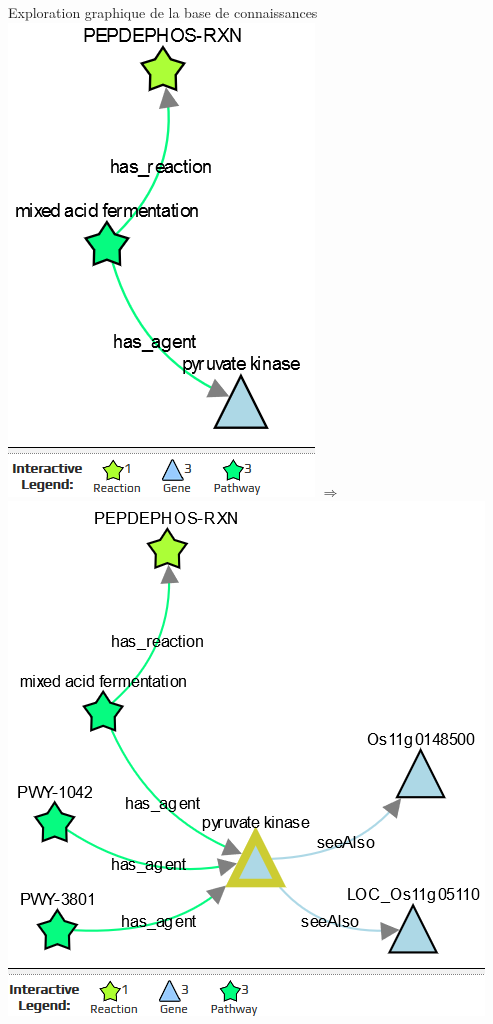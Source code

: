 \documentclass[newPxFont,pagenumber]{beamer}
\begin{document}
\begin{frame}{Exploration graphique de la base de connaissances}
  \centering \includegraphics[height=0.7\textheight]{explore-agrold1.png} $\Rightarrow$ \includegraphics[height=0.8\textheight]{explore-agrold2.png} 
\end{frame}
\end{document}
